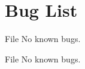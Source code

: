 \chapter{Bug List}
\hypertarget{bug}{}\label{bug}

\begin{DoxyRefList}
\item[File \doxylink{receiver_8c}{receiver.c} ]\label{bug__bug000001}%
%
No known bugs.  
\item[File \doxylink{sender_8c}{sender.c} ]\label{bug__bug000002}%
%
No known bugs. 
\end{DoxyRefList}